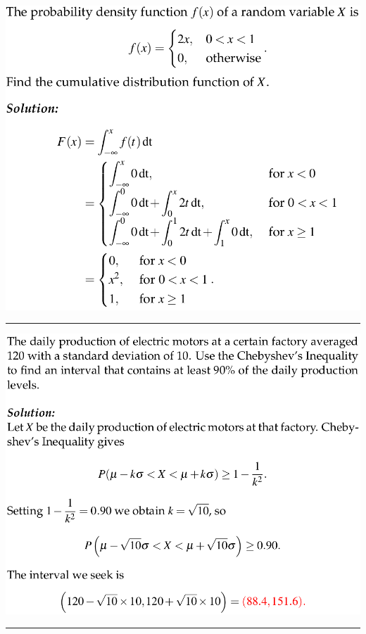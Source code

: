 \documentclass[a4paper, 12pt]{article}
\begin{document}
\begin{multicols*}{3}
\includegraphics[scale=0.25]{pdf-find-cdf.png}
\noindent\rule{\columnwidth}{0.5pt}
\includegraphics[scale=0.25]{chebyshev.png}
\noindent\rule{\columnwidth}{0.5pt}
%

\end{multicols*}
\end{document}
